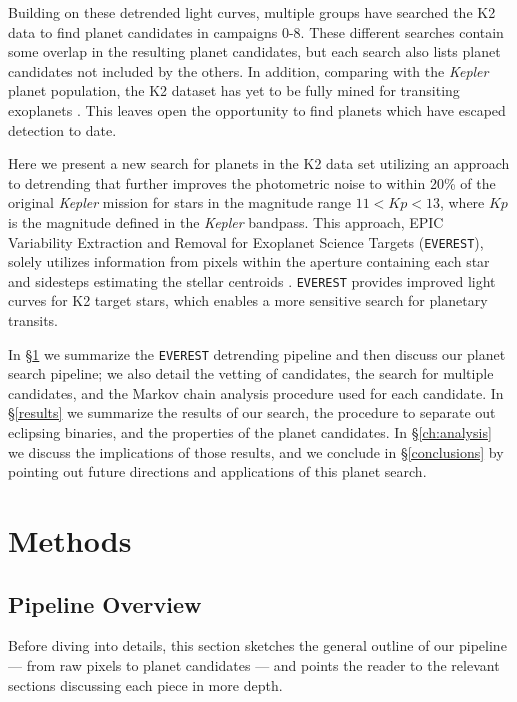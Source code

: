 \documentclass[twocolumn]{aastex62}
\newcommand{\project}[1]{\textsl{#1}}
\newcommand{\pipeline}[1]{\texttt{#1}}
\begin{document}
Building on these detrended light curves, multiple groups have
searched the K2 data to find planet candidates
\citep[e.g.][]{bar16a,cro16, van16b,pop16,pet18,may18} in campaigns
0-8.  These different searches contain some overlap in the resulting
planet candidates, but each search also lists planet candidates not
included by the others.  In addition, comparing with the
\project{Kepler} planet population, the K2 dataset has yet to be fully
mined for transiting exoplanets \citep{dot19}.  This leaves open the
opportunity to find planets which have escaped detection to date.

Here we present a new search for planets in the K2 data set utilizing
an approach to detrending that further improves the photometric noise
to within 20\% of the original \project{Kepler} mission for stars in
the magnitude range $11 < Kp < 13$, where $Kp$ is the magnitude
defined in the \project{Kepler} bandpass.  This approach, EPIC
Variability Extraction and Removal for Exoplanet Science Targets
(\pipeline{EVEREST}), solely utilizes information from pixels within
the aperture containing each star and sidesteps estimating the stellar
centroids \citep{lug16}.  \pipeline{EVEREST} provides improved light
curves for K2 target stars, which enables a more sensitive search for
planetary transits.

In \S\ref{methods} we summarize the \pipeline{EVEREST} detrending
pipeline and then discuss our planet search pipeline; we also detail
the vetting of candidates, the search for multiple candidates, and the
Markov chain analysis procedure used for each candidate.  In
\S\ref{results} we summarize the results of our search, the procedure
to separate out eclipsing binaries, and the properties of the planet
candidates.  In \S\ref{ch:analysis} we discuss the implications of
those results, and we conclude in \S\ref{conclusions} by pointing out
future directions and applications of this planet search.


\section{Methods} \label{methods}


\subsection{Pipeline Overview}

Before diving into details, this section sketches the general outline
of our pipeline --- from raw pixels to planet candidates --- and
points the reader to the relevant sections discussing each piece in
more depth.
\end{document}
